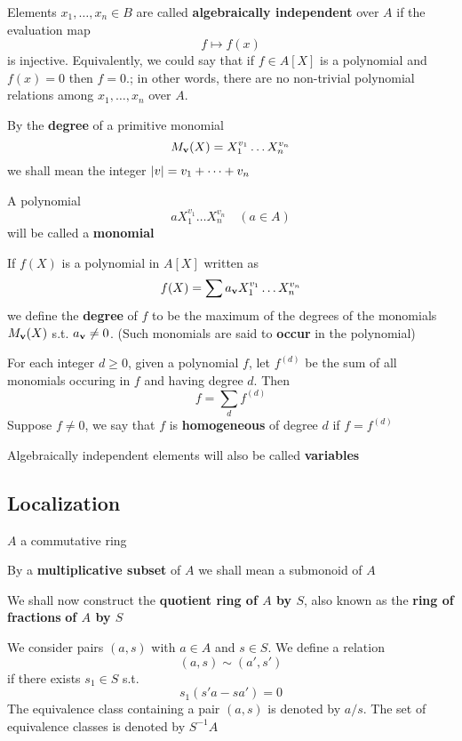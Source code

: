 \documentclass[11pt]{article}
\begin{document}
Elements \(x_1,\dots,x_n\in B\) are called \textbf{algebraically independent} over \(A\) if the evaluation map
\begin{equation*}
f\mapsto f(x)
\end{equation*}
is injective. Equivalently, we could say that if \(f\in A[X]\) is a polynomial and \(f(x)=0\)
then \(f=0\).; in other words, there are no non-trivial polynomial relations among \(x_1,\dots,x_n\)
over \(A\).

By the \textbf{degree} of a primitive monomial
\begin{equation*}
M_{\operatorname{\textbf{v}}}(X)=X_1^{v_1}\dots X_n^{v_n}
\end{equation*}
we shall mean the integer \(\abs{v}=v_1+\dots+v_n\)

A polynomial
\begin{equation*}
aX_1^{v_1}\dots X_n^{v_n}\quad(a\in A)
\end{equation*}
will be called a \textbf{monomial}

If \(f(X)\) is a polynomial in \(A[X]\) written as
\begin{equation*}
f(X)=\sum a_{\operatorname{\textbf{v}}}X_1^{v_1}\dots X_n^{v_n}
\end{equation*}
we define the \textbf{degree} of \(f\) to be the maximum of the degrees of the monomials \(M_{\operatorname{\textbf{v}}}(X)\)
s.t. \(a_{\operatorname{\textbf{v}}}\neq 0\). (Such monomials are said to \textbf{occur} in the polynomial)

For each integer \(d\ge 0\), given a polynomial \(f\), let \(f^{(d)}\) be the sum of all monomials
occuring in \(f\) and having degree \(d\). Then
\begin{equation*}
f=\sum_df^{(d)}
\end{equation*}
Suppose \(f\neq 0\), we say that \(f\) is \textbf{homogeneous} of degree \(d\) if \(f=f^{(d)}\)

Algebraically independent elements will also be called \textbf{variables}

\subsection{Localization}
\label{sec:org5fa613e}
\(A\) a commutative ring

By a \textbf{multiplicative subset} of \(A\) we shall mean a submonoid of \(A\)

We shall now construct the \textbf{quotient ring of \(A\) by \(S\)}, also known as the \textbf{ring of fractions}
\textbf{of \(A\) by \(S\)}

We consider pairs \((a,s)\) with \(a\in A\) and \(s\in S\). We define a relation
\begin{equation*}
(a,s)\sim (a',s')
\end{equation*}
if there exists \(s_1\in S\) s.t.
\begin{equation*}
s_1(s'a-sa')=0
\end{equation*}
The equivalence class containing a pair \((a,s)\) is denoted by \(a/s\). The set of equivalence
classes is denoted by \(S^{-1}A\)
\end{document}
